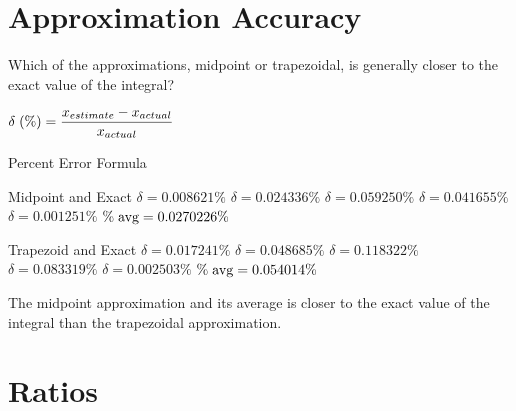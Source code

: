 \documentclass[letterpaper,12pt]{article}
\begin{document}
\section{Approximation Accuracy}

\begin{large}

 Which of the approximations, midpoint or trapezoidal, is generally closer to the exact value of the integral?

\end{large}

\vspace{1cm}

\Large\centerline{$\delta\hspace{0.1cm}(\%)=\dfrac{x_{estimate}-x_{actual}}{x_{actual}}$}
\normalsize

\vspace{0.7cm}
\centerline{Percent Error Formula}

\vspace{1cm}

\begin{minipage}{0.45\textwidth}
 \begin{center}
  Midpoint and Exact
  \vskip 16pt
  $\delta=0.008621\%$
  \vskip 16pt
  $\delta=0.024336\%$
  \vskip 16pt
  $\delta=0.059250\%$
  \vskip 16pt
  $\delta=0.041655\%$
  \vskip 16pt
  $\delta=0.001251\%$
  \vskip 16pt
  $\%\hspace{0.1cm}\text{avg}=0.0270226\%$
 \end{center}
\end{minipage}
\hfill
\begin{minipage}{0.45\textwidth}
 \begin{center}
  Trapezoid and Exact
  \vskip 16pt
  $\delta=0.017241\%$
  \vskip 16pt
  $\delta=0.048685\%$
  \vskip 16pt
  $\delta=0.118322\%$
  \vskip 16pt
  $\delta=0.083319\%$
  \vskip 16pt
  $\delta=0.002503\%$
  \vskip 16pt
  $\%\hspace{0.1cm}\text{avg}=0.054014\%$
 \end{center}
\end{minipage}

\vspace{1cm}

The midpoint approximation and its average is closer to the exact value of the integral than the trapezoidal approximation.

\newpage

\section{Ratios}
\end{document}
